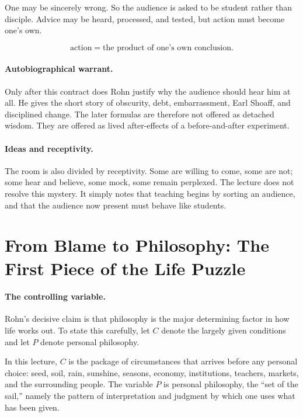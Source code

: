 One may be sincerely wrong. So the audience is asked to be student rather than disciple. Advice may be heard, processed, and tested, but action must become one's own.

\begin{equation}
\text{action} = \text{the product of one's own conclusion}.
\end{equation}

\paragraph{Autobiographical warrant.}
Only after this contract does Rohn justify why the audience should hear him at all. He gives the short story of obscurity, debt, embarrassment, Earl Shoaff, and disciplined change. The later formulas are therefore not offered as detached wisdom. They are offered as lived after-effects of a before-and-after experiment.

\paragraph{Ideas and receptivity.}
The room is also divided by receptivity. Some are willing to come, some are not; some hear and believe, some mock, some remain perplexed. The lecture does not resolve this mystery. It simply notes that teaching begins by sorting an audience, and that the audience now present must behave like students.

\section{From Blame to Philosophy: The First Piece of the Life Puzzle}

\paragraph{The controlling variable.}
Rohn's decisive claim is that philosophy is the major determining factor in how life works out. To state this carefully, let \(C\) denote the largely given conditions and let \(P\) denote personal philosophy.

\begin{definition}
In this lecture, \(C\) is the package of circumstances that arrives before any personal choice: seed, soil, rain, sunshine, seasons, economy, institutions, teachers, markets, and the surrounding people. The variable \(P\) is personal philosophy, the ``set of the sail,'' namely the pattern of interpretation and judgment by which one uses what has been given.
\end{definition}

